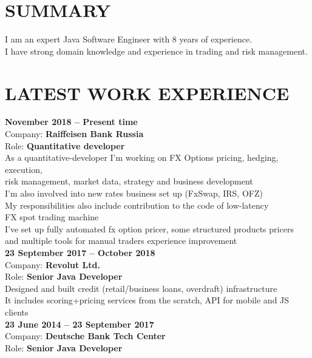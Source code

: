 \documentclass[margin,12pt]{res}
\begin{document}
  \address{
    kremsnx@gmail.com\\}

\begin{resume}
\section{SUMMARY}
I am an expert Java Software Engineer with 8 years of experience.\\
I have strong domain knowledge and experience in trading
and risk management.

\section{LATEST WORK EXPERIENCE}
\textbf{November 2018 -- Present time}\\
Company: \textbf{Raiffeisen Bank Russia}\\
Role: \textbf{Quantitative developer}\\
As a quantitative-developer I'm working on FX Options pricing, hedging, execution,\\
risk management, market data, strategy and business development\\
I'm also involved into new rates business set up (FxSwap, IRS, OFZ)\\
My responsibilities also include contribution to the code of low-latency\\
FX spot trading machine\\
I've set up fully automated fx option pricer, some structured products pricers\\
and multiple tools for manual traders experience improvement\\
\newline
\textbf{23 September 2017 -- October 2018}\\
Company: \textbf{Revolut Ltd.}\\
Role: \textbf{Senior Java Developer}\\
Designed and built credit (retail/business loans, overdraft) infrastructure\\
It includes scoring+pricing services from the scratch, API for mobile and JS clients\\
\newline
\textbf{23 June 2014 -- 23 September 2017}\\
Company: \textbf{Deutsche Bank Tech Center}\\
Role: \textbf{Senior Java Developer}\\

\end{resume}
\end{document}
